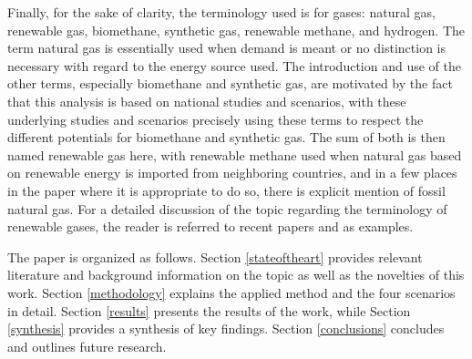 Finally, for the sake of clarity, the terminology used is for gases: natural gas, renewable gas, biomethane, synthetic gas, renewable methane, and hydrogen. The term natural gas is essentially used when demand is meant or no distinction is necessary with regard to the energy source used. The introduction and use of the other terms, especially biomethane and synthetic gas, are motivated by the fact that this analysis is based on national studies and scenarios, with these underlying studies and scenarios precisely using these terms to respect the different potentials for biomethane and synthetic gas. The sum of both is then named renewable gas here, with renewable methane used when natural gas based on renewable energy is imported from neighboring countries, and in a few places in the paper where it is appropriate to do so, there is explicit mention of fossil natural gas. For a detailed discussion of the topic regarding the terminology of renewable gases, the reader is referred to recent papers \cite{ridjan2016terminology} and \cite{legendre2023state} as examples.\vspace{0.3cm}

The paper is organized as follows. Section \ref{stateoftheart} provides relevant literature and background information on the topic as well as the novelties of this work. Section \ref{methodology} explains the applied method and the four scenarios in detail. Section \ref{results} presents the results of the work, while Section \ref{synthesis} provides a synthesis of key findings. Section \ref{conclusions} concludes and outlines future research.